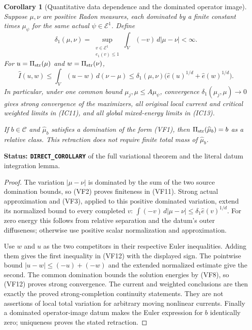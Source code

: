 \documentclass[11pt,a4paper]{article}
\numberwithin{equation}{section}
\newtheorem{corollary}[theorem]{Corollary}
\theoremstyle{definition}
\theoremstyle{remark}
\begin{document}
\begin{corollary}[Quantitative data dependence and the dominated operator image]
\label{cor:r11-strong-dominated-data-stability}
Suppose $\mu,\nu$ are positive Radon measures, each dominated
by a finite constant times $\mu_\psi$ for the same actual
$\psi\in\mathcal E^1$.  Define
\[
 \delta_1(\mu,\nu)
   =\sup_{\substack{v\in\mathcal E^1\\ e_1(v)\leq1}}
                          \int_V(-v)\,d|\mu-\nu|<\infty.
 \tag{VF11}
\]
For $u=\Pi_{\rm str}(\mu)$ and $w=\Pi_{\rm str}(\nu)$,
\[
 \widehat I(u,w)
  \leq\int_V(u-w)\,d(\nu-\mu)
  \leq\delta_1(\mu,\nu)
                 \bigl(\widehat e(u)^{1/d}+\widehat e(w)^{1/d}\bigr).
 \tag{VF12}
\]
In particular, under one common bound $\mu_j,\mu\leq A\mu_\psi$,
convergence $\delta_1(\mu_j,\mu)\to0$ gives strong convergence
of the maximizers, all original local current and critical weighted
limits in (IC11), and all global mixed-energy limits in (IC13).

If $b\in\mathscr C$ and $\widehat\mu_b$ satisfies a domination
of the form (VF1), then
$\Pi_{\rm str}(\widehat\mu_b)=b$ as a relative class.  This
retraction does not require finite total mass of $\widehat\mu_b$.
\end{corollary}

\noindent\textbf{Status: \texttt{DIRECT\_COROLLARY}} of
the full variational theorem and the literal datum integration lemma.

\begin{proof}
The variation $|\mu-\nu|$ is dominated by the sum of the two
source domination bounds, so (VF2) proves finiteness in (VF11).
Strong actual approximation and (VF3), applied to this positive
dominated variation, extend its normalized bound to every
completed $v$:
$\int(-v)\,d|\mu-\nu|\leq\delta_1\widehat e(v)^{1/d}$.
For zero energy this follows from relative separation and the
datum's outer diffuseness; otherwise use positive scalar
normalization and approximation.

Use $w$ and $u$ as the two competitors in their respective
Euler inequalities.  Adding them gives the first inequality
in (VF12) with the displayed sign.  The pointwise bound
$|u-w|\leq(-u)+(-w)$ and the extended normalized estimate
give the second.  The common domination bounds the solution
energies by (VF8), so (VF12) proves strong convergence.
The current and weighted conclusions are then exactly the
proved strong-completion continuity statements.  They are
not assertions of local total variation for arbitrary moving
nonlinear currents.  Finally a dominated operator-image datum
makes the Euler expression for $b$ identically zero; uniqueness
proves the stated retraction.
\end{proof}
\end{document}
